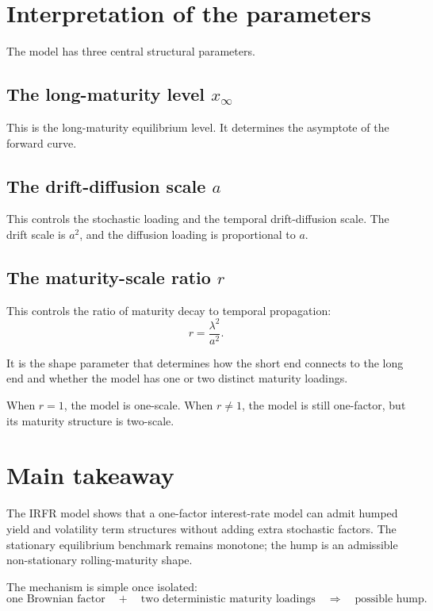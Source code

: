 \documentclass[11pt]{article}
\theoremstyle{plainbreak}
\begin{document}
\section{Interpretation of the parameters}

The model has three central structural parameters.

\subsection*{The long-maturity level \texorpdfstring{\(x_\infty\)}{x-infinity}}

This is the long-maturity equilibrium level. It determines the asymptote of the forward curve.

\subsection*{The drift-diffusion scale \texorpdfstring{\(a\)}{a}}

This controls the stochastic loading and the temporal drift-diffusion scale. The drift scale is \(a^2\), and the diffusion loading is proportional to \(a\).

\subsection*{The maturity-scale ratio \texorpdfstring{\(r\)}{r}}

This controls the ratio of maturity decay to temporal propagation:
\[
r=\frac{\lambda^2}{a^2}.
\]

It is the shape parameter that determines how the short end connects to the long end and whether the model has one or two distinct maturity loadings.

When \(r=1\), the model is one-scale. When \(r\neq 1\), the model is still one-factor, but its maturity structure is two-scale.

\section{Main takeaway}

The IRFR model shows that a one-factor interest-rate model can admit humped yield and volatility term structures without adding extra stochastic factors. The stationary equilibrium benchmark remains monotone; the hump is an admissible non-stationary rolling-maturity shape.

The mechanism is simple once isolated:
\[
\text{one Brownian factor}
\quad + \quad
\text{two deterministic maturity loadings}
\quad \Rightarrow \quad
\text{possible hump}.
\]
\end{document}
